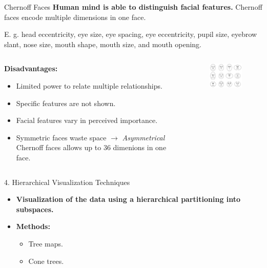 \begin{frame}{Chernoff Faces}
	\textbf{Human mind is able to distinguish facial features.} Chernoff faces
	encode multiple dimensions in one face.

	E. g. head eccentricity, eye size, eye spacing, eye eccentricity, pupil size,
	eyebrow slant, nose size, mouth shape, mouth size, and mouth opening.

	\vspace*{1em}
	\begin{columns}[t]
		\hspace*{1.4em}
		\begin{column}{0.6\textwidth}
			\textbf{Disadvantages:}
			\begin{itemize}
				\item Limited power to relate multiple relationships.
				\item Specific features are not shown.
				\item Facial features vary in perceived importance.
				\item Symmetric faces waste space $\rightarrow$ \textit{Asymmetrical } Chernoff
				      faces allows up to 36 dimenions in one face.
			\end{itemize}
		\end{column}
		\begin{column}{0.4\textwidth}
			\vspace*{-2em}
			\begin{figure}
				\centering
				\includegraphics[width=5cm]{img/chernoff_faces.png}
			\end{figure}
		\end{column}
	\end{columns}
\end{frame}


\begin{frame}{4. Hierarchical Visualization Techniques}
	\centering
	\begin{itemize}
		\item \textbf{Visualization of the data using a hierarchical partitioning into subspaces.}
		\item \textbf{Methods:}
		      \begin{itemize}
			      \item Tree maps.
			      \item Cone trees.
		      \end{itemize}
	\end{itemize}
\end{frame}


